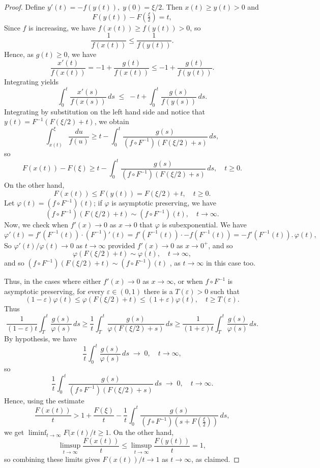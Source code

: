 \documentclass[a4paper,10pt,reqno]{amsart}
\numberwithin{equation}{section}
\theoremstyle{definition}
\theoremstyle{remark}
\DeclareMathOperator{\1}{\mathbbm 1}
\begin{document}
	\begin{proof}
		Define $y'(t) = -f(y(t)), \; y(0) = \xi/2$.  
		Then $x(t)\geq  y(t) > 0$ and
		\[
		F(y(t)) - F(\tfrac{\xi}{2}) = t,
		\]
		Since $f$ is increasing, we have $f(x(t)) \geq f(y(t)) > 0$, so 
		\[
		\frac{1}{f(x(t))} \leq  \frac{1}{f(y(t))}.
		\]
		Hence, as $g(t)\geq 0$, we have 
		\[
		\frac{x'(t)}{f(x(t))} 
		= -1 + \frac{g(t)}{f(x(t))}
		\leq  -1 + \frac{g(t)}{f(y(t))}.
		\]
		Integrating yields
		\[
		\int_0^t \frac{x'(s)}{f(x(s))}\, ds
		\;\leq\; -t + \int_0^t \frac{g(s)}{f(y(s))}\, ds.
		\]
		Integrating by substitution on the left hand side and notice that $y(t) = F^{-1}(F(\xi/2) + t)$, we obtain
		\[
		\int_{x(t)}^{\xi} \frac{du}{f(u)} \geq t - \int_{0}^{t} \frac{g(s)}{(f \circ F^{-1})(F(\xi/2)+s)} \, ds,
		\]
		so
		\[
		F(x(t)) - F(\xi) \geq t - \int_{0}^{t} 
		\frac{g(s)}{(f \circ F^{-1})(F(\xi/2)+s)} \, ds, \quad t\geq 0.
		\]
		On the other hand, 
		\[
		F(x(t)) \leq F(y(t)) = F(\xi/2) + t, \quad t\geq 0.
		\]
		Let $\varphi(t) = (f \circ F^{-1})(t)$; if $\varphi$ is asymptotic preserving, we have 
		\[
		(f \circ F^{-1})(F(\xi/2)+t) \sim (f \circ F^{-1})(t), 
		\quad t \to \infty.
		\]
		Now, we check when $f'(x)\to 0$ as $x\to 0$ that $\varphi$ is subexponential. We have 
		\[
		\varphi'(t) = f'\!\left(F^{-1}(t)\right)\cdot (F^{-1})'(t) 
		= f'\!\left(F^{-1}(t)\right)\cdot {-f(F^{-1}(t))}
		= {- f'(F^{-1}(t)).} \, \varphi(t),
		\]
		So $\varphi'(t)/\varphi(t)\to 0$ as $t\to\infty$ provided $f'(x) \to 0$ as $x \to 0^+$, and so 
		\[
		\varphi(F(\xi/2)+t) \sim \varphi(t), \quad t \to \infty,
		\]
		and so 	$(f \circ F^{-1})(F(\xi/2)+t) \sim (f \circ F^{-1})(t)$ , 
		as $t\to\infty$ in this case too. 
		
		Thus, in the cases where either $f'(x)\to 0$ as $x\to\infty$, or when $f\circ F^{-1}$ is asymptotic preserving, for every $\varepsilon \in (0,1)$ there is a $T(\varepsilon)>0$ such that  
		\[
		(1-\varepsilon)\varphi(t) \leq \varphi(F(\xi/2)+t) \leq (1+\varepsilon)\varphi(t),
		\quad  t \geq T(\varepsilon).
		\]
		Thus
		\[
		\frac{1}{(1-\varepsilon)t}\int_{T}^{t} \frac{g(s)}{\varphi(s)} \, ds
		\geq \frac{1}{t}\int_{T}^{t} 
		\frac{g(s)}{\varphi(F(\xi/2)+s)} \, ds
		\geq \frac{1}{(1+\varepsilon)t}\int_{T}^{t} \frac{g(s)}{\varphi(s)} \, ds.
		\]
		By hypothesis, we have 
		\[
		\frac{1}{t}\int_{0}^{t} \frac{g(s)}{\varphi(s)} \, ds \;\to\; 0, 
		\quad t \to \infty,
		\]
		so
		\[
		\frac{1}{t}\int_{0}^{t} 
		\frac{g(s)}{(f \circ F^{-1})(F(\xi/2)+s)} \, ds \;\to\; 0, 
		\quad t \to \infty.
		\]
		Hence, using the estimate 
		\[
		\frac{F(x(t))}{t} > 1 + \frac{F(\xi)}{t} - \frac{1}{t} \int_0^t \frac{g(s)}{(f \circ F^{-1})(s + F(\frac{\xi}{2}))} \, ds,
		\]
		we get $\liminf_{t \to \infty} F(x(t)/t \geq 1$. On the other hand, 
		\[
		\limsup_{t \to \infty} \frac{F(x(t))}{t} \leq \limsup_{t\to\infty} \frac{F(y(t))}{t}=1,
		\]
		so combining these limits gives $F(x(t))/t\to 1$ as $t\to\infty$, as claimed. 
	\end{proof}
\end{document}
